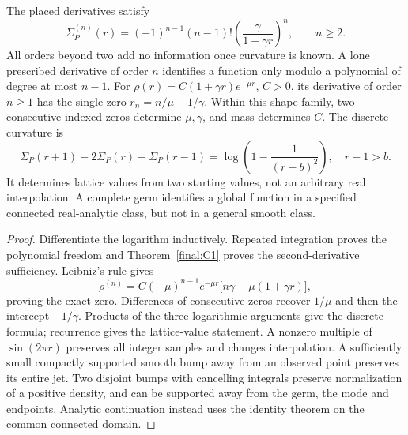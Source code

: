 \begin{proposition}
\label{final:C8}
The placed derivatives satisfy
\[
 \Sigma_P^{(n)}(r)=(-1)^{n-1}(n-1)!
       \left(\frac\gamma{1+\gamma r}\right)^n,
 \qquad n\ge2.
\]
All orders beyond two add no information once curvature is known.
A lone prescribed derivative of order $n$ identifies a function only
modulo a polynomial of degree at most $n-1$.
For $\rho(r)=C(1+\gamma r)e^{-\mu r}$, $C>0$, its derivative
of order $n\ge1$ has the single zero
$r_n=n/\mu-1/\gamma$. Within this shape family, two consecutive
indexed zeros determine $\mu,\gamma$, and mass determines $C$.
The discrete curvature is
\[
 \Sigma_P(r+1)-2\Sigma_P(r)+\Sigma_P(r-1)
 =\log\left(1-\frac1{(r-b)^2}\right),\quad r-1>b.
\]
It determines lattice values from two starting values, not an arbitrary
real interpolation. A complete germ identifies a global function in a
specified connected real-analytic class, but not in a general smooth class.
\end{proposition}
\begin{proof}
Differentiate the logarithm inductively. Repeated integration proves
the polynomial freedom and Theorem~\ref{final:C1} proves the
second-derivative sufficiency. Leibniz's rule gives
\[
 \rho^{(n)}=C(-\mu)^{n-1}e^{-\mu r}
       \bigl[n\gamma-\mu(1+\gamma r)\bigr],
\]
proving the exact zero. Differences of consecutive zeros recover
$1/\mu$ and then the intercept $-1/\gamma$. Products of the three
logarithmic arguments give the discrete formula; recurrence gives
the lattice-value statement. A nonzero multiple of $\sin(2\pi r)$
preserves all integer samples and changes interpolation. A sufficiently
small compactly supported smooth bump away from an observed point
preserves its entire jet. Two disjoint bumps with cancelling integrals
preserve normalization of a positive density, and can be supported away
from the germ, the mode and endpoints. Analytic continuation instead
uses the identity theorem on the common connected domain.
\end{proof}

